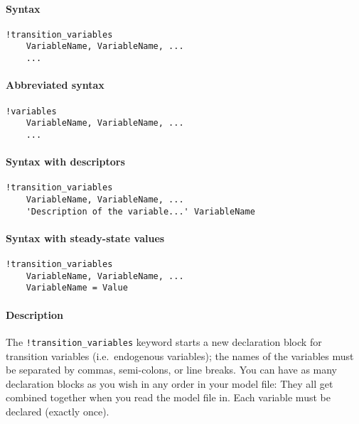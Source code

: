 


	\paragraph{Syntax}

\begin{verbatim}
!transition_variables
    VariableName, VariableName, ...
    ...
\end{verbatim}

\paragraph{Abbreviated syntax}

\begin{verbatim}
!variables
    VariableName, VariableName, ...
    ...
\end{verbatim}

\paragraph{Syntax with descriptors}

\begin{verbatim}
!transition_variables
    VariableName, VariableName, ...
    'Description of the variable...' VariableName
\end{verbatim}

\paragraph{Syntax with steady-state
values}

\begin{verbatim}
!transition_variables
    VariableName, VariableName, ...
    VariableName = Value
\end{verbatim}

\paragraph{Description}

The \texttt{!transition\_variables} keyword starts a new declaration
block for transition variables (i.e.~endogenous variables); the names of
the variables must be separated by commas, semi-colons, or line breaks.
You can have as many declaration blocks as you wish in any order in your
model file: They all get combined together when you read the model file
in. Each variable must be declared (exactly once).

